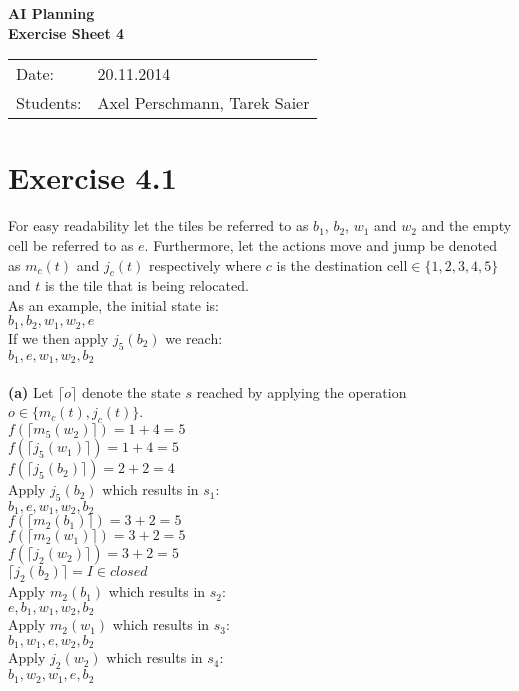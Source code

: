\documentclass[11pt,a4paper]{article}
\begin{document}
\begin{center}
\Huge{\textbf{AI Planning}}\\
\LARGE{\textbf{Exercise Sheet 4}}
\end{center}
\vspace{2cm}
\begin{tabular}{ll}
Date: & 20.11.2014\\
Students: & Axel Perschmann, Tarek Saier
\end{tabular}

\section*{Exercise 4.1}
For easy readability let the tiles be referred to as $b_1$, $b_2$, $w_1$ and $w_2$ and the empty cell be referred to as $e$. Furthermore, let the actions move and jump be denoted as $m_c(t)$ and $j_c(t)$ respectively where $c$ is the destination cell$\in \{1,2,3,4,5\}$ and $t$ is the tile that is being relocated.\\
As an example, the initial state is:\\
$b_1,b_2,w_1,w_2,e$\\
If we then apply $j_5(b_2)$ we reach:\\
$b_1,e,w_1,w_2,b_2$\\
\\
\textbf{(a)} Let $\lceil o\rceil$ denote the state $s$ reached by applying the operation $o\in \{m_c(t),j_c(t)\}$.\\
$f(\lceil m_5(w_2)\rceil)=1+4=5$\\
$f(\lceil j_5(w_1)\rceil)=1+4=5$\\
$f(\lceil j_5(b_2)\rceil)=2+2=4$\\
Apply $j_5(b_2)$ which results in $s_1$:\\
$b_1,e,w_1,w_2,b_2$\\
$f(\lceil m_2(b_1)\rceil)=3+2=5$\\
$f(\lceil m_2(w_1)\rceil)=3+2=5$\\
$f(\lceil j_2(w_2)\rceil)=3+2=5$\\
$\lceil j_2(b_2)\rceil=I\in closed$\\
Apply $m_2(b_1)$ which results in $s_2$:\\
$e,b_1,w_1,w_2,b_2$\\
Apply $m_2(w_1)$ which results in $s_3$:\\
$b_1,w_1,e,w_2,b_2$\\
Apply $j_2(w_2)$ which results in $s_4$:\\
$b_1,w_2,w_1,e,b_2$\\
\end{document}
